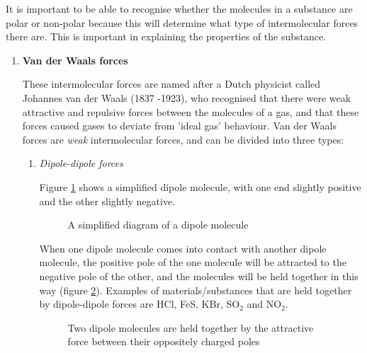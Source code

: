 It is important to be able to recognise whether the molecules in a substance are polar or non-polar because this will determine what type of intermolecular forces there are. This is important in explaining the properties of the substance.

\begin{enumerate}
\item{\textbf{Van der Waals forces}}

These intermolecular forces are named after a Dutch physicist called Johannes van der Waals (1837 -1923), who recognised that there were weak attractive and repulsive forces between the molecules of a gas, and that these forces caused gases to deviate from 'ideal gas' behaviour. Van der Waals forces are \textit{weak} intermolecular forces, and can be divided into three types:

\begin{enumerate}
\item{\textit{Dipole-dipole forces}

Figure \ref{fig:dipole} shows a simplified dipole molecule, with one end slightly positive and the other slightly negative.

\begin{figure}[H]
\begin{center}
\caption{A simplified diagram of a dipole molecule}
\label{fig:dipole}
\end{center}
\end{figure}

When one dipole molecule comes into contact with another dipole molecule, the positive pole of the one molecule will be attracted to the negative pole of the other, and the molecules will be held together in this way (figure \ref{fig:dipole-dipole}). Examples of materials/substances that are held together by dipole-dipole forces are HCl, FeS, KBr, SO$_{2}$ and NO$_{2}$.

\begin{figure}[H]
\begin{center}
\end{center}
\caption{Two dipole molecules are held together by the attractive force between their oppositely charged poles}
\label{fig:dipole-dipole}
\end{figure}
}


\end{enumerate}
\end{enumerate}
